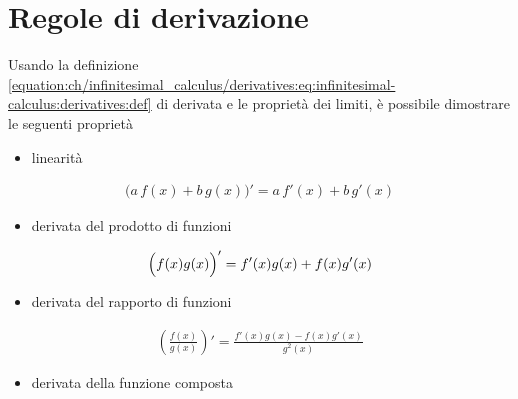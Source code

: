 \documentclass[letterpaper,10pt,italian]{jupyterBook}
\begin{document}
\section{Regole di derivazione}
\label{\detokenize{ch/infinitesimal_calculus/derivatives:regole-di-derivazione}}\label{\detokenize{ch/infinitesimal_calculus/derivatives:infinitesimal-calculus-derivatives-rules}}
\sphinxAtStartPar
Usando la definizione \eqref{equation:ch/infinitesimal_calculus/derivatives:eq:infinitesimal-calculus:derivatives:def} di derivata e le proprietà dei limiti, è possibile dimostrare le seguenti proprietà
\begin{itemize}
\item {} 
\sphinxAtStartPar
linearità

\end{itemize}
\begin{equation}\label{equation:ch/infinitesimal_calculus/derivatives:infinitesimal-calculus:derivatives:rules:linearity}
\begin{split}\big( a \, f(x) + b \, g(x) \big)' = a \, f'(x) + b \, g'(x)\end{split}
\end{equation}\begin{itemize}
\item {} 
\sphinxAtStartPar
derivata del prodotto di funzioni

\end{itemize}
\begin{equation}\label{equation:ch/infinitesimal_calculus/derivatives:infinitesimal-calculus:derivatives:rules:product}
\begin{split}\Bigl( f(x) g(x) \Bigr)' = f'(x) g(x) + f(x) g'(x)\end{split}
\end{equation}\begin{itemize}
\item {} 
\sphinxAtStartPar
derivata del rapporto di funzioni

\end{itemize}
\begin{equation}\label{equation:ch/infinitesimal_calculus/derivatives:infinitesimal-calculus:derivatives:rules:division}
\begin{split}\left( \frac{f(x)}{g(x)} \right)' = \frac{f'(x) g(x) - f(x) g'(x)}{g^2(x)}\end{split}
\end{equation}\begin{itemize}
\item {} 
\sphinxAtStartPar
derivata della funzione composta

\end{itemize}
\end{document}
